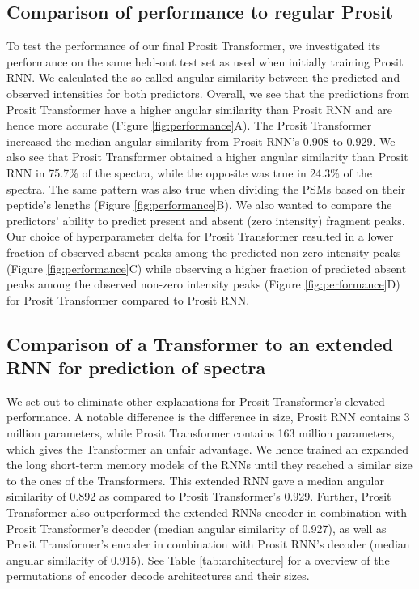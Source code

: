 \documentclass[10pt,a4paper]{article}
\begin{document}
\subsection*{Comparison of performance to regular Prosit}
    

To test the performance of our final Prosit Transformer, we investigated its performance on the same held-out test set as used when initially training Prosit RNN. We calculated the so-called angular similarity between the predicted and observed intensities for both predictors. Overall, we see that the predictions from Prosit Transformer have a higher angular similarity than Prosit RNN and are hence more accurate (Figure \ref{fig:performance}A). The Prosit Transformer increased the median angular similarity from Prosit RNN’s 0.908 to 0.929. We also see that Prosit Transformer obtained a higher angular similarity than Prosit RNN in 75.7\% of the spectra, while the opposite was true in 24.3\% of the spectra. The same pattern was also true when dividing the PSMs based on their peptide’s lengths (Figure \ref{fig:performance}B). We also wanted to compare the predictors’ ability to predict present and absent (zero intensity) fragment peaks.  Our choice of hyperparameter delta for Prosit Transformer resulted in a lower fraction of observed absent peaks among the predicted non-zero intensity peaks (Figure \ref{fig:performance}C) while observing a higher fraction of predicted absent peaks among the observed non-zero intensity peaks (Figure \ref{fig:performance}D) for Prosit Transformer compared to Prosit RNN.




\subsection*{Comparison of a Transformer to an extended RNN for prediction of spectra}

We set out to eliminate other explanations for Prosit Transformer's elevated performance. A notable difference is the difference in size, Prosit RNN contains 3 million parameters, while Prosit Transformer contains 163 million parameters, which gives the Transformer an unfair advantage. We hence trained an expanded the long short-term memory models of the RNNs until they reached a similar size to the ones of the Transformers. This extended RNN gave a median angular similarity of 0.892 as compared to Prosit Transformer's 0.929. Further, Prosit Transformer also outperformed the extended RNNs encoder in combination with Prosit Transformer’s decoder (median angular similarity of 0.927), as well as Prosit Transformer's encoder in combination with Prosit RNN's decoder (median angular similarity of 0.915). See Table \ref{tab:architecture} for a overview of the permutations of encoder decode architectures and their sizes.
\end{document}
